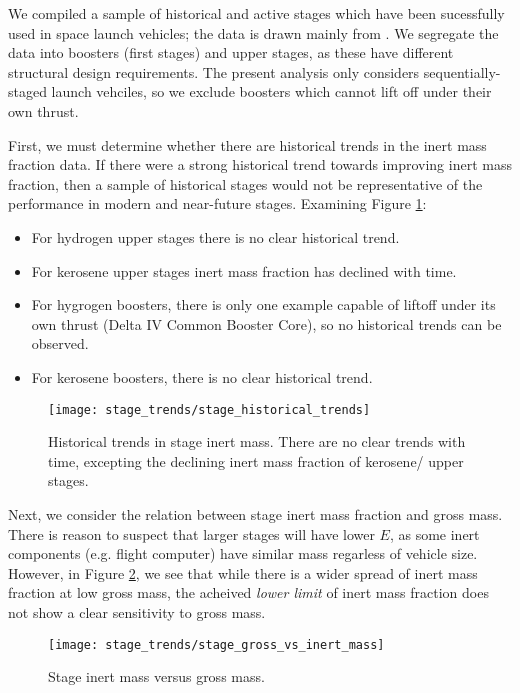 \documentclass[conf]{../paper/new-aiaa}
\begin{document}
We compiled a sample of historical and active stages which have been sucessfully used in space launch vehicles; the data is drawn mainly from \cite{Isakowitz2004}. We segregate the data into boosters (first stages) and upper stages, as these have different structural design requirements. The present analysis only considers sequentially-staged launch vehciles, so we exclude boosters which cannot lift off under their own thrust.

 First, we must determine whether there are historical trends in the inert mass fraction data. If there were a strong historical trend towards improving inert mass fraction, then a sample of historical stages would not be representative of the performance in modern and near-future stages. Examining Figure \ref{fig:stage_historical_trends}:
 \begin{itemize}
    \item For hydrogen upper stages there is no clear historical trend.
    \item For kerosene upper stages inert mass fraction has declined with time.
    \item For hygrogen boosters, there is only one example capable of liftoff under its own thrust (Delta IV Common Booster Core), so no historical trends can be observed.
    \item For kerosene boosters, there is no clear historical trend.
\end{itemize}


\begin{figure}[hbt!]
    \centering
    \texttt{[image: stage\_trends/stage\_historical\_trends]}
    \caption{\label{fig:stage_historical_trends} Historical trends in stage inert mass. There are no clear trends with time, excepting the declining inert mass fraction of kerosene/ upper stages.}
\end{figure}

Next, we consider the relation between stage inert mass fraction and gross mass. There is reason to suspect that larger stages will have lower $E$, as some inert components (e.g. flight computer) have similar mass regarless of vehicle size. However, in Figure \ref{fig:stage_gross_vs_inert_mass}, we see that while there is a wider spread of inert mass fraction at low gross mass, the acheived \emph{lower limit} of inert mass fraction does not show a clear sensitivity to gross mass.

\begin{figure}[hbt!]
    \centering
    \texttt{[image: stage\_trends/stage\_gross\_vs\_inert\_mass]}
    \caption{\label{fig:stage_gross_vs_inert_mass} Stage inert mass versus gross mass.}
\end{figure}
\end{document}
